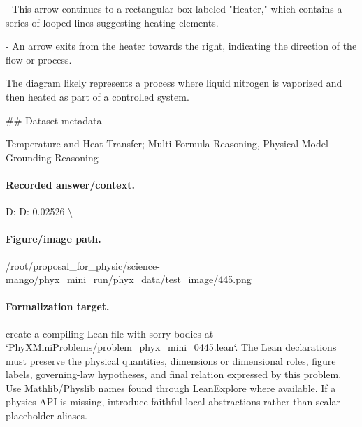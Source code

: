 - This arrow continues to a rectangular box labeled "Heater," which contains a series of looped lines suggesting heating elements.

- An arrow exits from the heater towards the right, indicating the direction of the flow or process.

The diagram likely represents a process where liquid nitrogen is vaporized and then heated as part of a controlled system.

\#\# Dataset metadata

Temperature and Heat Transfer; Multi-Formula Reasoning, Physical Model Grounding Reasoning

\paragraph{Recorded answer/context.}
D: D: 0.02526 \textbackslash{}

\paragraph{Figure/image path.}
/root/proposal\_for\_physic/science-mango/phyx\_mini\_run/phyx\_data/test\_image/445.png

\paragraph{Formalization target.}
create a compiling Lean file with sorry bodies at `PhyXMiniProblems/problem\_phyx\_mini\_0445.lean`. The Lean declarations must preserve the physical quantities, dimensions or dimensional roles, figure labels, governing-law hypotheses, and final relation expressed by this problem.
Use Mathlib/Physlib names found through LeanExplore where available. If a physics API is missing, introduce faithful local abstractions rather than scalar placeholder aliases.

